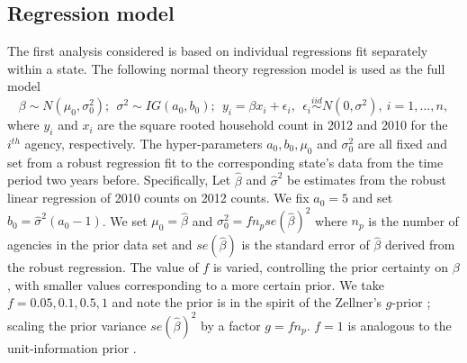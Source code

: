 \documentclass[12pt]{article}
\def\bbeta{\mbox{\boldmath $\beta$}}
\def\bmu{\mbox{\boldmath $\mu$}}
\newcommand{\bx}{\mbox{\boldmath $x$}}
\newcommand{\iid}{\stackrel{iid}{\sim}}
\begin{document}
\subsection{Regression model}
\label{regModelNW}
The first analysis considered is based on individual regressions fit separately within a state.  The following normal theory regression model is used as the full model 
\begin{equation}
\label{eq:regModel}
\beta\sim N(\mu_0, \sigma^{2}_0);\ \ \sigma^2\sim IG(a_0,b_0);\ \  
y_{i}=\beta x_{i} +\epsilon_{i},\ \ \epsilon_{i}\iid N(0, \sigma^2),\ i=1,\dots, n, 
\end{equation}
where $y_{i}$ and $x_{i}$ are the square rooted household count in 2012 and 2010 for the $i^{th}$ agency, respectively. 
The hyper-parameters $a_0, b_0, \mu_0$ and $\sigma^{2}_0$ are all fixed and set from a 
robust regression fit to the corresponding state's data from the time period two years
before. Specifically, Let $\hat\beta$ and $\hat\sigma^{2}$ be estimates from the robust linear regression of 2010 counts on 2012 counts.  We fix $a_0 = 5$ and set $b_0 = \hat\sigma^{2}(a_0 - 1)$. We set $\mu_0 = \hat\beta$ and $\sigma^{2}_0 =  fn_{p}se(\hat\beta)^{2}$ where $n_{p}$ is the number of agencies in the prior data set and $se(\hat\beta)$ is the standard error of $\hat\beta$ derived from the robust regression. The value of $f$ is varied, controlling the prior certainty on $\beta$, with smaller values corresponding to a more certain prior.  We take $f = 0.05, 0.1, 0.5, 1$ and note the prior is in the spirit of the Zellner's $g$-prior \citep{zellner1986, liang2008}; scaling the prior variance $se(\hat\beta)^{2}$ by a factor $g = fn_{p}$. $f = 1$ is analogous to the unit-information prior \citep{kass1995reference}.  %
\end{document}
